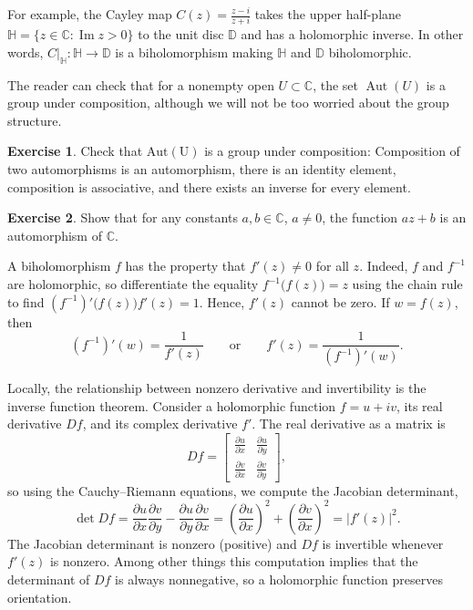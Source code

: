\documentclass[12pt,openany]{book}
\renewcommand{\Im}{\operatorname{Im}}
\newcommand{\babs}[1]{\bigl\lvert {#1} \bigr\rvert}
\newcommand{\C}{{\mathbb{C}}}
\newcommand{\D}{{\mathbb{D}}}
\newcommand{\bH}{{\mathbb{H}}}
\theoremstyle{plain}
\theoremstyle{remark}
\theoremstyle{definition}
\newenvironment{exbox}{%
    \def\FrameCommand{\vrule width 1pt \relax\hspace{10pt}}%
    \MakeFramed{\advance\hsize-\width\FrameRestore}%
}{%
    \endMakeFramed
}
\theoremstyle{exercise}
\newtheorem{exercise}{Exercise}[section]
\theoremstyle{example}
\begin{document}
For example, the Cayley map
$C(z)
=
\frac{z - i}{z + i}$
takes the upper half-plane
$\bH = \{ z \in \C : \Im z > 0 \}$ to the unit disc $\D$ and
has a holomorphic inverse.
In other words, $C|_{\bH} \colon \bH \to \D$ is a biholomorphism
making $\bH$ and $\D$ biholomorphic.

The reader can check that for a nonempty open $U \subset \C$, the set
$\operatorname{Aut}(U)$ is a group under
composition, although we will not be too worried about the group
structure.

\begin{exbox}
\begin{exercise}
Check that
$\operatorname{Aut(U)}$ is a group under composition:
Composition of two automorphisms is an automorphism,
there is an identity element,
composition is associative,
and there exists an inverse for every element.
\end{exercise}

\begin{exercise}
Show that for any constants $a,b \in \C$, $a \not= 0$, the function
$a z + b$ is an automorphism of $\C$.
\end{exercise}
\end{exbox}

A biholomorphism $f$ has the property that $f'(z) \not= 0$ for all $z$.
Indeed,
$f$ and $f^{-1}$ are holomorphic, so differentiate the
equality
$f^{-1}\bigl(f(z)\bigr) = z$ using the chain rule to find
$(f^{-1})' \bigl(f(z)\bigr) f'(z) = 1$.  Hence, $f'(z)$ cannot be zero.
If $w = f(z)$, then
\begin{equation*}
(f^{-1})'(w) = \frac{1}{f'(z)}
\qquad \text{or} \qquad
f'(z) =
\frac{1}{(f^{-1})'(w)} .
\end{equation*}

Locally, the relationship between nonzero derivative and invertibility is
the inverse function theorem.  Consider a holomorphic function
$f = u+iv$, its real derivative $Df$, and its complex derivative $f'$.
The real derivative as a matrix is
\begin{equation*}
Df =
\begin{bmatrix}
\frac{\partial u}{\partial x} & \frac{\partial u}{\partial y} \\[5pt]
\frac{\partial v}{\partial x} & \frac{\partial v}{\partial y}
\end{bmatrix} ,
\end{equation*}
so using the Cauchy--Riemann equations, we compute the Jacobian determinant,
\begin{equation*}
\det Df =
\frac{\partial u}{\partial x}
\frac{\partial v}{\partial y} -
\frac{\partial u}{\partial y} 
\frac{\partial v}{\partial x}
=
{\left(\frac{\partial u}{\partial x}\right)}^2
+
{\left(\frac{\partial v}{\partial x}\right)}^2
=
\babs{f'(z)}^2 .
\end{equation*}
The Jacobian determinant is nonzero (positive) and $Df$ is invertible
whenever $f'(z)$ is nonzero.
Among other things this computation
implies that the determinant of
$Df$ is always nonnegative, so a holomorphic function preserves orientation.
\end{document}
